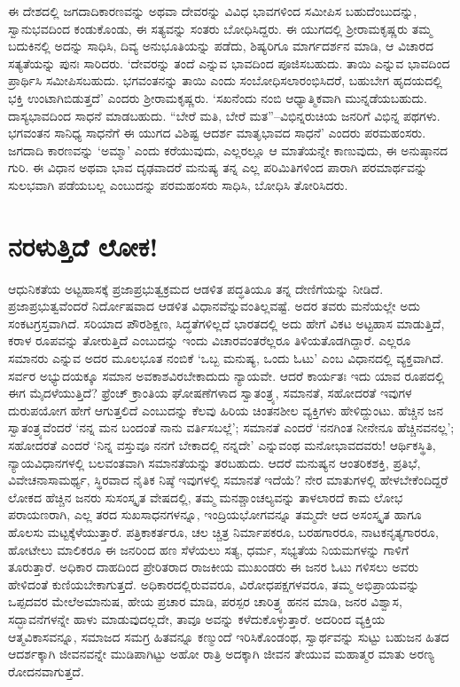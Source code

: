 ಈ ದೇಶದಲ್ಲಿ ಜಗದಾದಿಕಾರಣವನ್ನು ಅಥವಾ ದೇವರನ್ನು ವಿವಿಧ ಭಾವಗಳಿಂದ ಸಮೀಪಿಸ ಬಹುದೆಂಬುದನ್ನು, ಸ್ವಾನುಭವದಿಂದ ಕಂಡುಕೊಂಡು, ಈ ಸತ್ಯವನ್ನು ಸಂತರು ಬೋಧಿಸಿದ್ದರು. ಈ ಯುಗದಲ್ಲಿ ಶ‍್ರೀರಾಮಕೃಷ್ಣರು ತಮ್ಮ ಬದುಕಿನಲ್ಲಿ ಅದನ್ನು ಸಾಧಿಸಿ, ದಿವ್ಯ ಅನುಭೂತಿಯನ್ನು ಪಡೆದು, ಶಿಷ್ಯರಿಗೂ ಮಾರ್ಗದರ್ಶನ ಮಾಡಿ, ಆ ವಿಚಾರದ ಸತ್ಯತೆಯನ್ನು ಪುನಃ ಸಾರಿದರು. ‘ದೇವರನ್ನು ತಂದೆ ಎನ್ನುವ ಭಾವದಿಂದ ಪೂಜಿಸಬಹುದು. ತಾಯಿ ಎನ್ನುವ ಭಾವದಿಂದ ಪ್ರಾರ್ಥಿಸಿ ಸಮೀಪಿಸಬಹುದು. ಭಗವಂತನನ್ನು ತಾಯಿ ಎಂದು ಸಂಬೋಧಿಸಲಾರಂಭಿಸಿದರೆ, ಬಹುಬೇಗ ಹೃದಯದಲ್ಲಿ ಭಕ್ತಿ ಉಂಟಾಗಿಬಿಡುತ್ತದೆ’ ಎಂದರು ಶ‍್ರೀರಾಮಕೃಷ್ಣರು. ‘ಸಖನೆಂದು ನಂಬಿ ಆಧ್ಯಾತ್ಮಿಕವಾಗಿ ಮುನ್ನಡೆಯಬಹುದು. ದಾಸ್ಯಭಾವದಿಂದ ಸಾಧನೆ ಮಾಡಬಹುದು. “ಬೇರೆ ಮತಿ, ಬೇರೆ ಮತ”–ವಿಭಿನ್ನರುಚಿಯ ಜನರಿಗೆ ವಿಭಿನ್ನ ಪಥಗಳು. ಭಗವಂತನ ಸಾನಿಧ್ಯ ಸಾಧನೆಗೆ ಈ ಯುಗದ ವಿಶಿಷ್ಟ ಆದರ್ಶ ಮಾತೃಭಾವದ ಸಾಧನೆ’ ಎಂದರು ಪರಮಹಂಸರು. ಜಗದಾದಿ ಕಾರಣವನ್ನು ‘ಅಮ್ಮಾ’ ಎಂದು ಕರೆಯುವುದು, ಎಲ್ಲರಲ್ಲೂ ಆ ಮಾತೆಯನ್ನೇ ಕಾಣುವುದು, ಈ ಅನುಷ್ಠಾನದ ಗುರಿ. ಈ ವಿಧಾನ ಅಥವಾ ಭಾವ ದೃಢವಾದರೆ ಮನುಷ್ಯ ತನ್ನ ಎಲ್ಲ ಪರಿಮಿತಿಗಳಿಂದ ಪಾರಾಗಿ ಪರಮಾರ್ಥವನ್ನು ಸುಲಭವಾಗಿ ಪಡೆಯಬಲ್ಲ ಎಂಬುದನ್ನು ಪರಮಹಂಸರು ಸಾಧಿಸಿ, ಬೋಧಿಸಿ ತೋರಿಸಿದರು.


\section*{ನರಳುತ್ತಿದೆ ಲೋಕ!}

\vskip -6.5pt

ಆಧುನಿಕತೆಯ ಅಟ್ಟಹಾಸಕ್ಕೆ ಪ್ರಜಾಪ್ರಭುತ್ವಕ್ರಮದ ಆಡಳಿತ ಪದ್ಧತಿಯೂ ತನ್ನ ದೇಣಿಗೆಯನ್ನು ನೀಡಿದೆ. ಪ್ರಜಾಪ್ರಭುತ್ವವೆಂದರೆ ನಿರ್ದೋಷವಾದ ಆಡಳಿತ ವಿಧಾನವೆನ್ನುವಂತಿಲ್ಲವಷ್ಟೆ. ಅದರ ತವರು ಮನೆಯಲ್ಲೇ ಅದು ಸಂಕಟಗ್ರಸ್ತವಾಗಿದೆ. ಸರಿಯಾದ ಪೌರಶಿಕ್ಷಣ, ಸಿದ್ಧತೆಗಳಿಲ್ಲದೆ ಭಾರತದಲ್ಲಿ ಅದು ಹೇಗೆ ವಿಕಟ ಅಟ್ಟಹಾಸ ಮಾಡುತ್ತಿದೆ, ಕರಾಳ ರೂಪವನ್ನು ತೋರುತ್ತಿದೆ ಎಂಬುದನ್ನು ಇಂದು ವಿಚಾರವಂತರೆಲ್ಲರೂ ತಿಳಿಯತೊಡಗಿದ್ದಾರೆ. ಎಲ್ಲರೂ ಸಮಾನರು ಎನ್ನುವ ಅದರ ಮೂಲಭೂತ ನಂಬಿಕೆ ‘ಒಬ್ಬ ಮನುಷ್ಯ, ಒಂದು ಓಟು’ ಎಂಬ ವಿಧಾನದಲ್ಲಿ ವ್ಯಕ್ತವಾಗಿದೆ. ಸರ್ವರ ಅಭ್ಯುದಯಕ್ಕೂ ಸಮಾನ ಅವಕಾಶವಿರಬೇಕಾದುದು ನ್ಯಾಯವೇ. ಆದರೆ ಕಾರ್ಯತಃ ಇದು ಯಾವ ರೂಪದಲ್ಲಿ ಈಗ ಮೈದಳೆಯುತ್ತಿದೆ? ಫ್ರೆಂಚ್ ಕ್ರಾಂತಿಯ ಘೋಷಣೆಗಳಾದ ಸ್ವಾತಂತ್ರ್ಯ, ಸಮಾನತೆ, ಸಹೋದರತೆ ಇವುಗಳ ದುರುಪಯೋಗ ಹೇಗೆ ಆಗುತ್ತಲಿದೆ ಎಂಬುದನ್ನು ಕೆಲವು ಹಿರಿಯ ಚಿಂತನಶೀಲ ವ್ಯಕ್ತಿಗಳು ಹೇಳಿದ್ದುಂಟು. ಹೆಚ್ಚಿನ ಜನ ಸ್ವಾತಂತ್ರ್ಯವೆಂದರೆ ‘ನನ್ನ ಮನ ಬಂದಂತೆ ನಾನು ವರ್ತಿಸಬಲ್ಲೆ’; ಸಮಾನತೆ ಎಂದರೆ ‘ನನಗಿಂತ ನೀನೇನೂ ಹೆಚ್ಚಿನವನಲ್ಲ’; ಸಹೋದರತೆ ಎಂದರೆ ‘ನಿನ್ನ ವಸ್ತುವೂ ನನಗೆ ಬೇಕಾದಲ್ಲಿ ನನ್ನದೇ’ ಎನ್ನುವಂಥ ಮನೋಭಾವದವರು! ಆರ್ಥಿಕಸ್ಥಿತಿ, ನ್ಯಾಯವಿಧಾನಗಳಲ್ಲಿ ಬಲವಂತವಾಗಿ ಸಮಾನತೆಯನ್ನು ತರಬಹುದು. ಆದರೆ ಮನುಷ್ಯನ ಆಂತರಿಕಶಕ್ತಿ, ಪ್ರತಿಭೆ, ವಿವೇಚನಾಸಾಮರ್ಥ್ಯ, ಸ್ಥಿರವಾದ ನೈತಿಕ ನಿಷ್ಠೆ ಇವುಗಳಲ್ಲಿ ಸಮಾನತೆ ಇದೆಯೆ? ನೇರ ಮಾತುಗಳಲ್ಲಿ ಹೇಳಬೇಕೆಂದಿದ್ದರೆ ಲೋಕದ ಹೆಚ್ಚಿನ ಜನರು ಸುಸಂಸ್ಕೃತ ವೇಷದಲ್ಲಿ, ತಮ್ಮ ಮನಶ್ಚಾಂಚಲ್ಯವನ್ನು ತಾಳಲಾರದೆ ಕಾಮ ಲೋಭ ಪರಾಯಣರಾಗಿ, ಎಲ್ಲ ತರದ ಸುಖಸಾಧನಗಳನ್ನೂ, ಇಂದ್ರಿಯಭೋಗವನ್ನೂ ತಮ್ಮದೇ ಆದ ಅಸಂಸ್ಕೃತ ಹಾಗೂ ಹೊಲಸು ಮಟ್ಟಕ್ಕೆಳೆಯುತ್ತಾರೆ. ಪತ್ರಿಕಾಕರ್ತರೂ, ಚಲ ಚ್ಚಿತ್ರ ನಿರ್ಮಾಪಕರೂ, ಬರಹಗಾರರೂ, ನಾಟಕನೃತ್ಯಗಾರರೂ, ಹೋಟೇಲು ಮಾಲಿಕರೂ ಈ ಜನರಿಂದ ಹಣ ಸೆಳೆಯಲು ಸತ್ಯ, ಧರ್ಮ, ಸಭ್ಯತೆಯ ನಿಯಮಗಳನ್ನು ಗಾಳಿಗೆ ತೂರುತ್ತಾರೆ. ಅಧಿಕಾರ ದಾಹದಿಂದ ಪ್ರೇರಿತರಾದ ರಾಜಕೀಯ ಮುಖಂಡರು ಈ ಜನರ ಓಟು ಗಳಿಸಲು ಅವರು ಹೇಳಿದಂತೆ ಕುಣಿಯಬೇಕಾಗುತ್ತದೆ. ಅಧಿಕಾರ\-ದಲ್ಲಿರು\-ವವರೂ, ವಿರೋಧಪಕ್ಷಗಳವರೂ, ತಮ್ಮ ಅಭಿಪ್ರಾಯವನ್ನು ಒಪ್ಪದವರ ಮೇಲೆ\break ಅಮಾನುಷ, ಹೇಯ ಪ್ರಚಾರ ಮಾಡಿ, ಪರಸ್ಪರ ಚಾರಿತ್ರ್ಯ ಹನನ ಮಾಡಿ, ಜನರ ವಿಶ್ವಾಸ, ಸದ್ಭಾವನೆಗಳನ್ನೇ ಹಾಳು ಮಾಡುವುದಲ್ಲದೇ, ತಾವೂ ಅವನ್ನು ಕಳೆದುಕೊಳ್ಳುತ್ತಾರೆ. ಅದರಿಂದ ವ್ಯಕ್ತಿಯ ಆತ್ಮವಿಕಾಸವನ್ನೂ, ಸಮಾಜದ ಸಮಗ್ರ ಹಿತವನ್ನೂ ಕಣ್ಮುಂದೆ ಇರಿಸಿಕೊಂಡಂಥ, ಸ್ವಾರ್ಥವನ್ನು ಸುಟ್ಟು ಬಹುಜನ ಹಿತದ ಆದರ್ಶಕ್ಕಾಗಿ ಜೀವನವನ್ನೇ ಮುಡಿಪಾಗಿಟ್ಟು ಅಹೋ ರಾತ್ರಿ ಅದಕ್ಕಾಗಿ ಜೀವನ ತೇಯುವ ಮಹಾತ್ಮರ ಮಾತು ಅರಣ್ಯ ರೋದನವಾಗುತ್ತದೆ.

